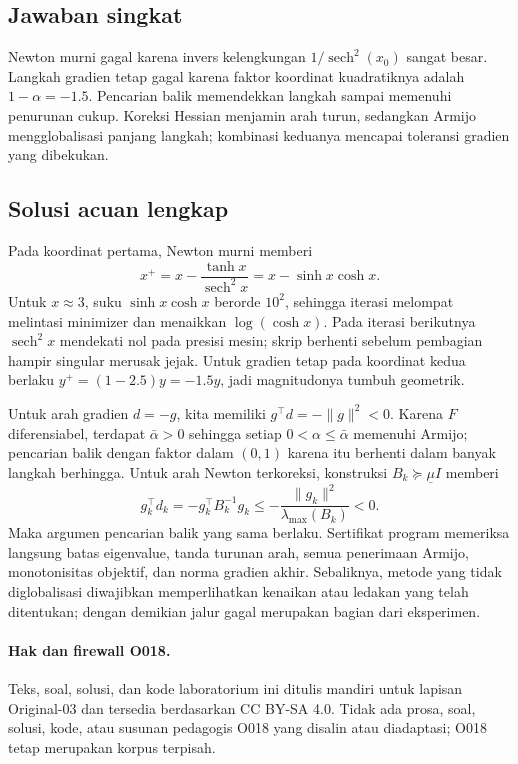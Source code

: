 \subsection*{Jawaban singkat}
\label{orig03:lab:answer:0003}
Newton murni gagal karena invers kelengkungan
$1/\operatorname{sech}^2(x_0)$ sangat besar. Langkah gradien tetap gagal
karena faktor koordinat kuadratiknya adalah $1-\alpha=-1.5$. Pencarian balik
memendekkan langkah sampai memenuhi penurunan cukup. Koreksi Hessian menjamin
arah turun, sedangkan Armijo mengglobalisasi panjang langkah; kombinasi
keduanya mencapai toleransi gradien yang dibekukan.

\subsection*{Solusi acuan lengkap}
\label{orig03:lab:solution:0003}
Pada koordinat pertama, Newton murni memberi
\[
 x^+=x-\frac{\tanh x}{\operatorname{sech}^2x}
     =x-\sinh x\cosh x.
\]
Untuk $x\approx3$, suku $\sinh x\cosh x$ berorde $10^2$, sehingga iterasi
melompat melintasi minimizer dan menaikkan $\log(\cosh x)$. Pada iterasi
berikutnya $\operatorname{sech}^2x$ mendekati nol pada presisi mesin; skrip
berhenti sebelum pembagian hampir singular merusak jejak. Untuk gradien tetap
pada koordinat kedua berlaku $y^+=(1-2.5)y=-1.5y$, jadi magnitudonya tumbuh
geometrik.

Untuk arah gradien $d=-g$, kita memiliki $g^\top d=-\|g\|^2<0$. Karena $F$
diferensiabel, terdapat $\bar\alpha>0$ sehingga setiap
$0<\alpha\leq\bar\alpha$ memenuhi Armijo; pencarian balik dengan faktor dalam
$(0,1)$ karena itu berhenti dalam banyak langkah berhingga. Untuk arah Newton
terkoreksi, konstruksi $B_k\succeq\underline\mu I$ memberi
\[
 g_k^\top d_k=-g_k^\top B_k^{-1}g_k
 \leq-\frac{\|g_k\|^2}{\lambda_{\max}(B_k)}<0.
\]
Maka argumen pencarian balik yang sama berlaku. Sertifikat program memeriksa
langsung batas eigenvalue, tanda turunan arah, semua penerimaan Armijo,
monotonisitas objektif, dan norma gradien akhir. Sebaliknya, metode yang tidak
diglobalisasi diwajibkan memperlihatkan kenaikan atau ledakan yang telah
ditentukan; dengan demikian jalur gagal merupakan bagian dari eksperimen.

\paragraph{Hak dan firewall O018.}
Teks, soal, solusi, dan kode laboratorium ini ditulis mandiri untuk lapisan
Original-03 dan tersedia berdasarkan CC BY-SA 4.0. Tidak ada prosa, soal,
solusi, kode, atau susunan pedagogis O018 yang disalin atau diadaptasi; O018
tetap merupakan korpus terpisah.
